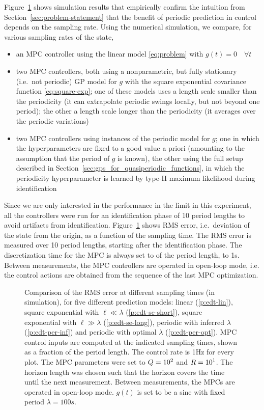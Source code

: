 Figure~\ref{fig:error_vs_dt} shows simulation results that empirically confirm
the intuition from Section~\ref{sec:problem-statement} that the benefit of
periodic prediction in control depends on the sampling rate. Using the numerical
simulation, we compare, for various sampling rates of the state,
\begin{itemize}
\item an MPC controller using the linear model
\eqref{eq:problem} with \mbox{$g(t) = 0\quad \forall t$}
\item two MPC controllers, both using a nonparametric, but fully stationary
(i.e.\ not periodic) GP model for $g$ with the square exponential covariance
function \eqref{eq:square-exp}; one of these models uses a length scale smaller
than the periodicity (\ie it can extrapolate periodic swings locally, but not
beyond one period); the other a length scale longer than the periodicity (\ie it
averages over the periodic variations)
\item two MPC controllers using instances of the periodic model for $g$; one in
which the hyperparameters are fixed to a good value a priori (amounting to the
assumption that the period of $g$ is known), the other using the full setup
described in Section~\ref{sec:gps_for_quasiperiodic_functions}, in which the
periodicity hyperparameter is learned by type-II maximum likelihood during
identification
\end{itemize}
Since we are only interested in the performance in the limit in this experiment,
all the controllers were run for an identification phase of 10 period lengths
to avoid artifacts from identification.
Figure~\ref{fig:error_vs_dt} shows RMS error, i.e.\ deviation of the state from
the origin, as a function of the sampling time. The RMS error is measured over
10 period lengths, starting after the identification phase. The discretization
time for the MPC is always set to  of the period length, \ie to
1\unit{s}. Between measurements, the MPC controllers are operated in open-loop
mode, i.e. the control actions are obtained from the sequence of the last MPC
optimization.

\begin{figure}
\centering%
\footnotesize%
%
\caption[Comparison of the RMS error at different sampling times.]{Comparison
of the RMS error at different sampling times (in simulation), for five different
prediction models: linear (\ref*{p:edt-lin}), square exponential with $\ell \ll
\lambda$ (\ref*{p:edt-se-short}), square exponential with $\ell \gg \lambda$
(\ref*{p:edt-se-long}), periodic with inferred $\lambda$ (\ref*{p:edt-per-inf})
and periodic with optimal $\lambda$ (\ref*{p:edt-per-opt}).
MPC control inputs are computed at the indicated sampling times, shown as a
fraction of the period length. The control rate is 1\unit{Hz} for every plot.
The MPC parameters were set to $Q=10^2$ and $R=10^1$. The horizon length was
chosen such that the horizon covers the time until the next measurement.
Between measurements, the MPCs are operated in open-loop mode. $g(t)$ is set to
be a sine with fixed period $\lambda = 100\unit{s}$. }
\label{fig:error_vs_dt}
\end{figure}

